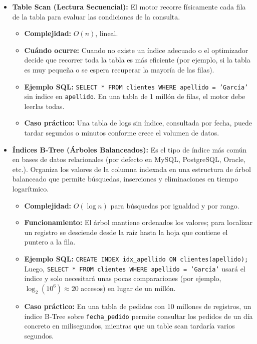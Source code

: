 \documentclass[12pt,a4paper,openany,oneside]{book}
\begin{document}
\begin{itemize}
    \item \textbf{Table Scan (Lectura Secuencial):} El motor recorre físicamente cada fila de la tabla para evaluar las condiciones de la consulta.
    \begin{itemize}
        \item \textbf{Complejidad:} $O(n)$, lineal.
        \item \textbf{Cuándo ocurre:} Cuando no existe un índice adecuado o el optimizador decide que recorrer toda la tabla es más eficiente (por ejemplo, si la tabla es muy pequeña o se espera recuperar la mayoría de las filas).
        \item \textbf{Ejemplo SQL:} \texttt{SELECT * FROM clientes WHERE apellido = 'García'} sin índice en \texttt{apellido}. En una tabla de 1 millón de filas, el motor debe leerlas todas.
        \item \textbf{Caso práctico:} Una tabla de logs sin índice, consultada por fecha, puede tardar segundos o minutos conforme crece el volumen de datos.
    \end{itemize}
    
    \item \textbf{Índices B-Tree (Árboles Balanceados):} Es el tipo de índice más común en bases de datos relacionales (por defecto en MySQL, PostgreSQL, Oracle, etc.). Organiza los valores de la columna indexada en una estructura de árbol balanceado que permite búsquedas, inserciones y eliminaciones en tiempo logarítmico.
    \begin{itemize}
        \item \textbf{Complejidad:} $O(\log n)$ para búsquedas por igualdad y por rango.
        \item \textbf{Funcionamiento:} El árbol mantiene ordenados los valores; para localizar un registro se desciende desde la raíz hasta la hoja que contiene el puntero a la fila.
        \item \textbf{Ejemplo SQL:} \texttt{CREATE INDEX idx\_apellido ON clientes(apellido);} Luego, \texttt{SELECT * FROM clientes WHERE apellido = 'García'} usará el índice y solo necesitará unas pocas comparaciones (por ejemplo, $\log_2(10^6) \approx 20$ accesos) en lugar de un millón.
        \item \textbf{Caso práctico:} En una tabla de pedidos con 10 millones de registros, un índice B-Tree sobre \texttt{fecha\_pedido} permite consultar los pedidos de un día concreto en milisegundos, mientras que un table scan tardaría varios segundos.
    \end{itemize}
    

\end{itemize}
\end{document}
